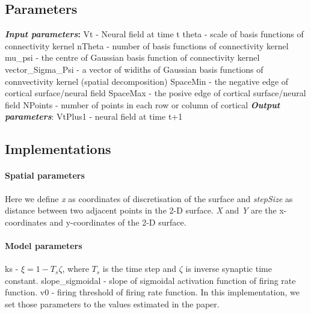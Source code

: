 \documentclass[a4paper, 12pt, english]{article}
\begin{document}
\subsection{Parameters}
\textbf{\textit{Input parameters}:}\newline
Vt - Neural field at time t\newline
theta - scale of basis functions of connectivity kernel\newline
nTheta - number of basis functions of connectivity kernel\newline
mu\_psi - the centre of Gaussian basis function of connectivity kernel\newline
vector\_Sigma\_Psi - a vector of widiths of Gaussian basis functions of
connvectivity kernel (spatial decomposition)\newline
SpaceMin - the negative edge of cortical surface/neural field\newline
SpaceMax - the posive edge of cortical surface/neural field\newline
NPoints - number of points in each row or column of cortical\newline
\textbf{\textit{Output parameters}}:\newline
VtPlus1 - neural field at time t+1\newline

\subsection{Implementations}

\paragraph{Spatial parameters\newline}
Here we define \textit{x} as coordinates of discretisation of the surface and
\textit{stepSize} as distance between two adjacent points in the 2-D surface.
\textit{X} and \textit{Y} are the x-coordinates and y-coordinates of the 2-D surface.


\paragraph{Model parameters\newline}
ks - $\xi = 1 - T_s\zeta $, where $T_s$ is the time step and $\zeta $ is inverse synaptic time constant. \newline
slope\_sigmoidal - slope of sigmoidal activation function of firing rate function.\newline
v0 - firing threshold of firing rate function.\newline
In this implementation, we set those parameters to the values estimated in the paper.
\end{document}
